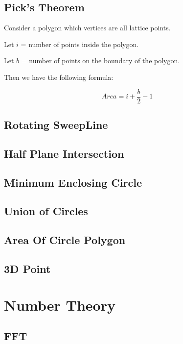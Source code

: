 \documentclass[a4paper,10pt,twocolumn,oneside,x11names]{article}
\begin{document}
\subsection{Pick's Theorem}
Consider a polygon which vertices are all lattice points.

Let $i$ = number of points inside the polygon.

Let $b$ = number of points on the boundary of the polygon.

Then we have the following formula:

$$
Area = i + \frac{b}{2} - 1
$$

\subsection{Rotating SweepLine}


\subsection{Half Plane Intersection}


\subsection{Minimum Enclosing Circle}


\subsection{Union of Circles}


\subsection{Area Of Circle Polygon}


\subsection{3D Point}


\section{Number Theory}

\subsection{FFT}

\end{document}
